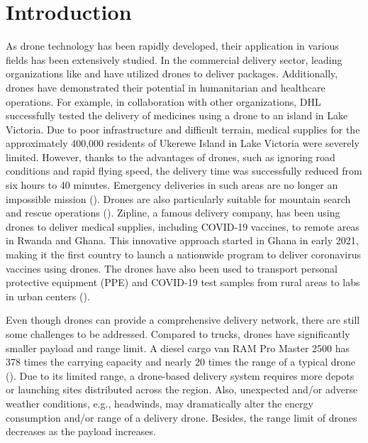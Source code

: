 \documentclass[preprint,review,11pt,authoryear]{elsarticle}
\begin{document}
\section{Introduction} \label{sec:introduction}
As drone technology has been rapidly developed, their application in various fields has been extensively studied. In the commercial delivery sector, leading organizations like \cite{ups2017drone} and \cite{amazon2022drone} have utilized drones to deliver packages. Additionally, drones have demonstrated their potential in humanitarian and healthcare operations. For example, in collaboration with other organizations, DHL successfully tested the delivery of medicines using a drone to an island in Lake Victoria. Due to poor infrastructure and difficult terrain, medical supplies for the approximately 400,000 residents of Ukerewe Island in Lake Victoria were severely limited. However, thanks to the advantages of drones, such as ignoring road conditions and rapid flying speed, the delivery time was successfully reduced from six hours to 40 minutes. Emergency deliveries in such areas are no longer an impossible mission (\cite{dhl2018drone}). Drones are also particularly suitable for mountain search and rescue operations (\cite{karaca2018potential}). Zipline, a famous delivery company, has been using drones to deliver medical supplies, including COVID-19 vaccines, to remote areas in Rwanda and Ghana. This innovative approach started in Ghana in early 2021, making it the first country to launch a nationwide program to deliver coronavirus vaccines using drones. The drones have also been used to transport personal protective equipment (PPE) and COVID-19 test samples from rural areas to labs in urban centers (\cite{Zipline2020}).

Even though drones can provide a comprehensive delivery network, there are still some challenges to be addressed. Compared to trucks, drones have significantly smaller payload and range limit. A diesel cargo van RAM Pro Master 2500 has 378 times the carrying capacity and nearly 20 times the range of a typical drone (\cite{figliozzi2017lifecycle}). Due to its limited range, a drone-based delivery system requires more depots or launching sites distributed across the region. Also, unexpected and/or adverse weather conditions, e.g., headwinds, may dramatically alter the energy consumption and/or range of a delivery drone. Besides, the range limit of drones decreases as the payload increases. 
\end{document}
